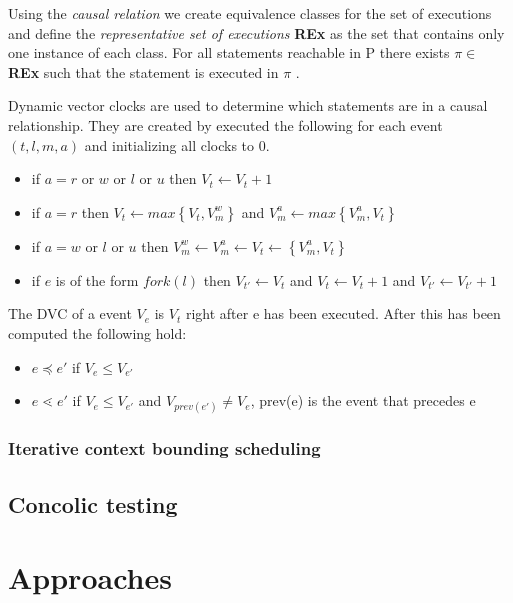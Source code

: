\documentclass[10pt]{llncs}
\begin{document}
Using the \emph{causal relation} we create equivalence classes for the set of executions and define the \emph{representative set of executions} \textbf{REx} as the set that contains only one instance of each class. For all statements reachable in P there exists $\pi \in$ \textbf{REx} such that the statement is executed in $\pi$ \cite[§4]{base4}.

Dynamic vector clocks are used to determine which statements are in a causal relationship. They are created by executed the following for each event $(t, l, m, a)$ and initializing all clocks to $0$.

\begin{itemize}
	\item if $a = r$ or $w$ or $l$ or $u$ then $V_t \leftarrow V_t + 1$
	\item if $a = r$ then $V_t \leftarrow max \left\lbrace V_t, V_m^w \right\rbrace$ and $V_m^a \leftarrow max \left\lbrace V_m^a, V_t \right\rbrace$
	\item  if $a = w$ or $l$ or $u$ then $V_m^w \leftarrow V_m^a \leftarrow V_t \leftarrow \left\lbrace V_m^a, V_t \right\rbrace$
	\item if $e$ is of the form $fork(l)$ then $V_{t'} \leftarrow V_t$ and $V_t \leftarrow V_t + 1$ and $V_{t'} \leftarrow V_{t'} + 1$
\end{itemize}

The DVC of a event $V_e$ is $V_t$ right after e has been executed. After this has been computed the following hold:

\begin{itemize}
	\item $e \preceq e'$ if $V_e \leq V_{e'}$
	\item $e \lessdot e'$ if $V_e \leq V_{e'}$ and $V_{prev(e')} \neq V_e$, prev(e) is the event that precedes e
\end{itemize}

\subsubsection{Iterative context bounding scheduling}

\subsection{Concolic testing}

\section{Approaches}
\label{approaches}
\end{document}

